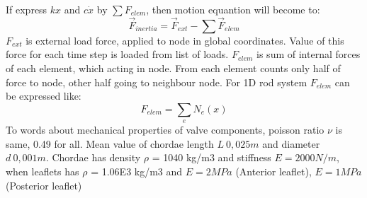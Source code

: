 If express $kx$ and $c\dot{x}$ by $\sum{F_{elem}}$,  then motion equantion will
become to:
\begin{equation}\label{eqn:sumF}
  \vec{F}_{inertia}= \vec{F}_{ext} - \sum\vec{F}_{elem}
\end{equation}
$F_{ext}$ is external load force, applied to node in global coordinates. Value
of this force for each time step is loaded from list of loads. $F_{elem}$ is sum
of internal forces of each element, which acting in node. From each element
counts only half of force to node, other half going to neighbour node.
For 1D rod system $F_{elem}$ can be expressed like:
\begin{equation}\label{eqn:Felem}
  F_{elem} = \sum_{e}N_e(x)
\end{equation}
To words about mechanical properties of valve components, poisson ratio $\nu$ is same, 0.49 for all.
Mean value of chordae length $L ~ 0,025 m$ and diameter $d ~ 0,001 m$. Chordae has density $\rho$
= 1040 kg/m3 and stiffness $E = 2000 N/m$, when leaflets has $\rho$ = 1.06E3 kg/m3 and 
$E = 2 MPa$ (Anterior leaflet), $E = 1 MPa$ (Posterior leaflet)\par